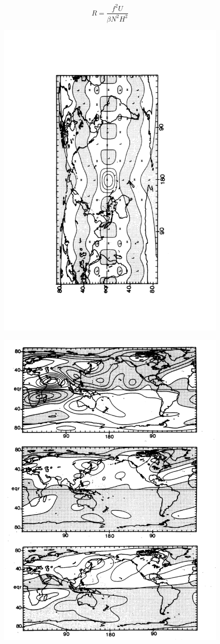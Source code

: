 \[R =\frac{f^2 U}{\beta N^2H^2}\]

\begin{figure}
\centering
\includegraphics[width = .7 \textwidth]{figs/GD/Heat1.png}
\caption{}
\end{figure}

\begin{figure}
\centering
\includegraphics[width = .7 \textwidth]{figs/GD/Heat2.png}
\caption{}
\end{figure}


